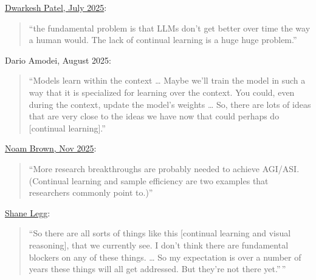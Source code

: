 \documentclass[
  letterpaper,
  DIV=11,
  numbers=noendperiod,
  oneside]{scrartcl}
\begin{document}
\begin{description}
\href{https://www.dwarkesh.com/p/timelines-june-2025}{Dwarkesh Patel,
July 2025}:

\begin{quote}
``the fundamental problem is that LLMs don't get better over time the
way a human would. The lack of continual learning is a huge huge
problem.''
\end{quote}

Dario Amodei, August 2025:

\begin{quote}
``Models learn within the context \ldots{} Maybe we'll train the model
in such a way that it is specialized for learning over the context. You
could, even during the context, update the model's weights \ldots{} So,
there are lots of ideas that are very close to the ideas we have now
that could perhaps do {[}continual learning{]}.''
\end{quote}

\href{https://x.com/polynoamial/status/1994439121243169176}{Noam Brown,
Nov 2025}:

\begin{quote}
``More research breakthroughs are probably needed to achieve AGI/ASI.
(Continual learning and sample efficiency are two examples that
researchers commonly point to.)''
\end{quote}
\end{description}

\href{https://www.youtube.com/watch?v=l3u_FAv33G0&t=3s}{Shane Legg}:

\begin{quote}
``So there are all sorts of things like this {[}continual learning and
visual reasoning{]}, that we currently see. I don't think there are
fundamental blockers on any of these things. \ldots{} So my expectation
is over a number of years these things will all get addressed. But
they're not there yet.''\,''
\end{quote}
\end{document}
